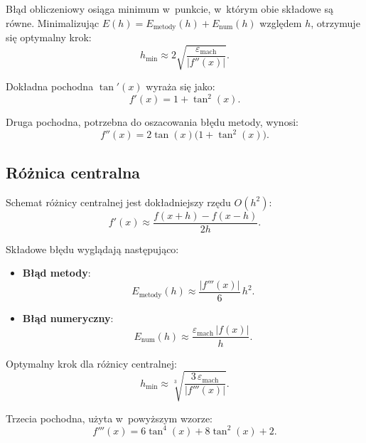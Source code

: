 \documentclass[12pt, a4paper]{article}
\begin{document}
Błąd obliczeniowy osiąga minimum w~punkcie, w~którym obie składowe są równe. Minimalizując $E(h) = E_{\text{metody}}(h) + E_{\text{num}}(h)$ względem $h$, otrzymuje się optymalny krok:
\begin{equation}
  h_{\min} \approx 2\sqrt{\frac{\varepsilon_{\text{mach}}}{|f''(x)|}}.
  \label{eq:hmin_fwd}
\end{equation}

Dokładna pochodna $\tan'(x)$ wyraża się jako:
\begin{equation}
  f'(x) = 1 + \tan^2(x).
\end{equation}

Druga pochodna, potrzebna do oszacowania błędu metody, wynosi:
\begin{equation}
  f''(x) = 2\tan(x)\bigl(1 + \tan^2(x)\bigr).
\end{equation}

\subsection{Różnica centralna}

Schemat różnicy centralnej jest dokładniejszy rzędu $O(h^2)$:
\begin{equation}
  f'(x) \approx \frac{f(x+h) - f(x-h)}{2h}.
  \label{eq:central}
\end{equation}

Składowe błędu wyglądają następująco:
\begin{itemize}
  \item \textbf{Błąd metody}:
    \begin{equation}
      E_{\text{metody}}(h) \approx \frac{|f'''(x)|}{6}\, h^2.
      \label{eq:err_method_cen}
    \end{equation}
  \item \textbf{Błąd numeryczny}:
    \begin{equation}
      E_{\text{num}}(h) \approx \frac{\varepsilon_{\text{mach}}\,|f(x)|}{h}.
      \label{eq:err_num_cen}
    \end{equation}
\end{itemize}

Optymalny krok dla różnicy centralnej:
\begin{equation}
  h_{\min} \approx \sqrt[3]{\frac{3\,\varepsilon_{\text{mach}}}{|f'''(x)|}}.
  \label{eq:hmin_cen}
\end{equation}

Trzecia pochodna, użyta w~powyższym wzorze:
\begin{equation}
  f'''(x) = 6\tan^4(x) + 8\tan^2(x) + 2.
\end{equation}
\end{document}
